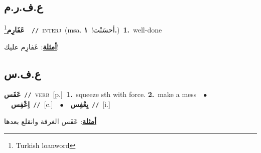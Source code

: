 \documentclass[10pt,a4paper,twoside]{article} %
\begin{document}
\begin{multicols}{2}
\vspace{-3mm}
\subsection*{\color{blue}\foreignlanguage{arabic}{ع.ف.ر.م}\color{blue}{ (ntws)}} 

{\setlength\topsep{0pt}\textbf{\foreignlanguage{arabic}{عَفَارِم}}\footnote{Turkish loanword}\ \ {\color{gray}\texttt{//}\color{black}}\ \textsc{interj}\ \color{gray}(msa. \foreignlanguage{arabic}{أحسَنْت!}~\foreignlanguage{arabic}{\textbf{١.}})\color{black}\ \textbf{1.}~well-done\  \begin{flushright}\color{gray}\foreignlanguage{arabic}{\textbf{\underline{\foreignlanguage{arabic}{أمثلة}}}: عَفارِم عليك!}\end{flushright}\color{black}} \vspace{2mm}

\vspace{-3mm}
\subsection*{\color{blue}\foreignlanguage{arabic}{ع.ف.س}\color{blue}{}} 

{\setlength\topsep{0pt}\textbf{\foreignlanguage{arabic}{عَفَس}}\ {\color{gray}\texttt{//}\color{black}}\ \textsc{verb}\ [p.]\ \textbf{1.}~squeeze sth with force.  \textbf{2.}~make a mess\ \ $\bullet$\ \ \setlength\topsep{0pt}\textbf{\foreignlanguage{arabic}{اِعْفِس}}\ {\color{gray}\texttt{//}\color{black}}\ [c.]\ \ $\bullet$\ \ \setlength\topsep{0pt}\textbf{\foreignlanguage{arabic}{يِعْفِس}}\ {\color{gray}\texttt{//}\color{black}}\ [i.]\  \begin{flushright}\color{gray}\foreignlanguage{arabic}{\textbf{\underline{\foreignlanguage{arabic}{أمثلة}}}: عَفَس الغرفة وانقلع بعدها}\end{flushright}\color{black}} \vspace{2mm}


\end{multicols}
\end{document}
